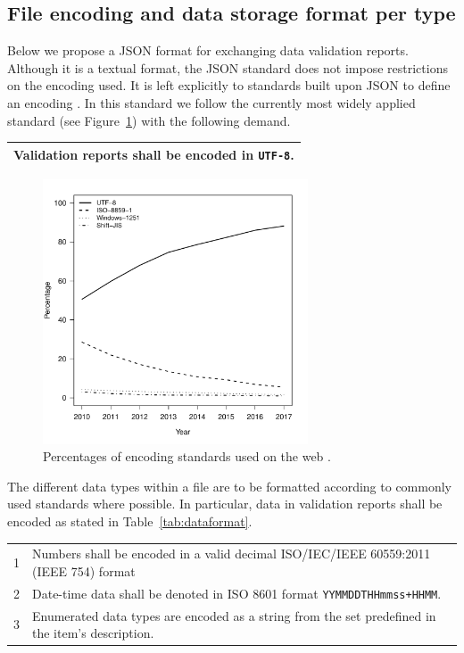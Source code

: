 \documentclass[a4paper, 11pt,titlepage]{article}
\newcommand{\code}[1]{\texttt{#1}}
\begin{document}
\subsection{File encoding and data storage format per type}
Below we propose a JSON format \citep{ecma2013json} for exchanging data
validation reports.  Although it is a textual format, the JSON standard does
not impose restrictions on the encoding used. It is left explicitly to
standards built upon JSON to define an encoding \citep[pp ii]{ecma2013json}. In
this standard we follow the currently most widely applied standard (see
Figure~\ref{fig:encoding}) with the following demand.

\begin{center}
\label{tab:encoding}
\begin{tabular}{|p{}|}
\hline
Validation reports shall be encoded in \code{UTF-8}.\\
\hline
\end{tabular}
\end{center}

\begin{figure}[t]
\centering
\includegraphics[width=0.7\textwidth]{fig/encoding_use.pdf}
\caption{Percentages of encoding standards used on the web \citep{w3techs2017}.}
\label{fig:encoding}
\end{figure}

The different data types within a file are to be formatted according to
commonly used standards where possible. In particular, data in validation
reports shall be encoded as stated in Table~\ref{tab:dataformat}.
\begin{center}
\begin{tabular}{|lp{}|}
\hline
1&Numbers shall be encoded in a valid decimal ISO/IEC/IEEE 60559:2011 (IEEE 754) format \\
2&Date-time data shall be denoted in ISO 8601 format \code{YYMMDDTHHmmss+HHMM}. \\
3&Enumerated data types are encoded as a string from the set predefined in the item's description.\\
\hline
\end{tabular}
\label{tab:dataformat}
\end{center}
\end{document}
